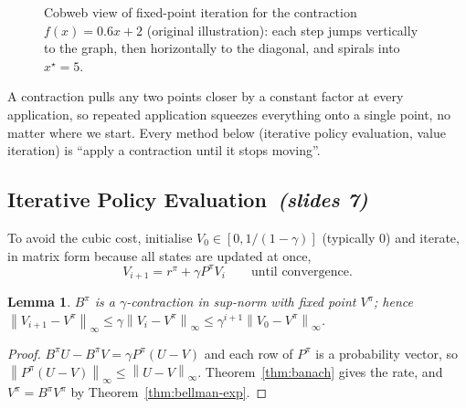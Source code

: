 \documentclass[11pt,a4paper]{article}
\newcommand{\norm}[1]{\left\lVert #1\right\rVert_\infty}
\newcommand{\sltag}[1]{\texorpdfstring{\ \emph{(slides #1)}}{ (slides #1)}}
\theoremstyle{plain}
\newtheorem{lemma}[theorem]{Lemma}
\theoremstyle{definition}
\theoremstyle{remark}
\begin{document}
\begin{figure}[h]
\centering
{}
\caption{Cobweb view of fixed-point iteration for the contraction $f(x)=0.6x+2$ (original illustration): each step jumps vertically to the graph, then horizontally to the diagonal, and spirals into $x^\star=5$.}
\end{figure}

\begin{intuition}
A contraction pulls any two points closer by a constant factor at every application, so repeated application squeezes everything onto a single point, no matter where we start. Every method below (iterative policy evaluation, value iteration) is ``apply a contraction until it stops moving''.
\end{intuition}

\subsection{Iterative Policy Evaluation\sltag{7}}
To avoid the cubic cost, initialise $V_0\in[0,1/(1-\gamma)]$ (typically $0$) and iterate, in matrix form because all states are updated at once,
\[
V_{i+1}=r^\pi+\gamma P^\pi V_i\qquad\text{until convergence.}
\]
\begin{lemma}\label{lem:Bpi}
$B^\pi$ is a $\gamma$-contraction in sup-norm with fixed point $V^\pi$; hence $\norm{V_{i+1}-V^\pi}\le\gamma\norm{V_i-V^\pi}\le\gamma^{i+1}\norm{V_0-V^\pi}$.
\end{lemma}
\begin{proof}
$B^\pi U-B^\pi V=\gamma P^\pi(U-V)$ and each row of $P^\pi$ is a probability vector, so $\norm{P^\pi(U-V)}\le\norm{U-V}$. Theorem~\ref{thm:banach} gives the rate, and $V^\pi=B^\pi V^\pi$ by Theorem~\ref{thm:bellman-exp}.
\end{proof}
\end{document}
